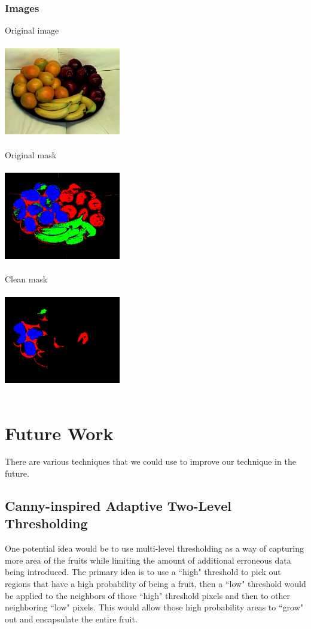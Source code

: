 \documentclass{article}
\begin{document}
\subsubsection{Images}
Original image\\~\\
\includegraphics[width=2in]{fruit_tray.png}\\~\\
Original mask\\~\\
\includegraphics[width=2in]{fruit_tray_step1.png}\\~\\
Clean mask\\~\\
\includegraphics[width=2in]{fruit_tray_step2.png}\\~\\

\section{Future Work}
There are various techniques that we could use to improve our technique in the future.
\subsection{Canny-inspired Adaptive Two-Level Thresholding}
One potential idea would be to use multi-level thresholding as a way of capturing more area of the fruits while limiting the amount of additional erroneous data being introduced. The primary idea is to use a ``high" threshold to pick out regions that have a high probability of being a fruit, then a ``low" threshold would be applied to the neighbors of those ``high" threshold pixels and then to other neighboring ``low" pixels. This would allow those high probability areas to ``grow" out and encapsulate the entire fruit.
\end{document}
